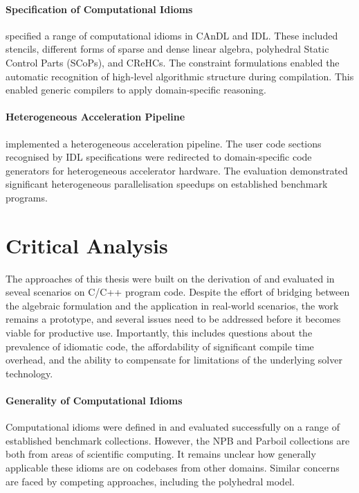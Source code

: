     \paragraph*{Specification of Computational Idioms}
     specified a range of
    computational idioms in CAnDL and IDL.
    These included stencils, different forms of sparse and dense linear algebra,
    polyhedral Static Control Parts (SCoPs), and CReHCs.
    The constraint formulations enabled the automatic recognition of high-level
    algorithmic structure during compilation.
    This enabled generic compilers to apply domain-specific reasoning.

\paragraph*{Heterogeneous Acceleration Pipeline}

     implemented a heterogeneous acceleration pipeline.
    The user code sections recognised by IDL specifications were redirected to
    domain-specific code generators for heterogeneous accelerator hardware.
    The evaluation demonstrated significant heterogeneous parallelisation
    speedups on established benchmark programs.

\section{Critical Analysis}

    The approaches of this thesis were built on the derivation of
     and evaluated in seveal scenarios on C/C++ program
    code.
    Despite the effort of bridging between the algebraic formulation and the
    application in real-world scenarios, the work remains a prototype, and
    several issues need to be addressed before it becomes viable for productive
    use.
    Importantly, this includes questions about the prevalence of idiomatic code,
    the affordability of significant compile time overhead, and the ability to
    compensate for limitations of the underlying solver technology.

\paragraph*{Generality of Computational Idioms}  

    Computational idioms were defined in
     and
    evaluated successfully on a range of established benchmark collections.
    However, the NPB and Parboil collections are both from areas of scientific
    computing.
    It remains unclear how generally applicable these idioms are on codebases
    from other domains.
    Similar concerns are faced by competing approaches, including the
    polyhedral model.

